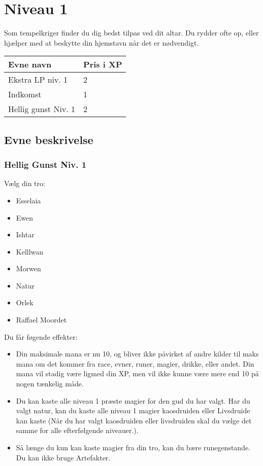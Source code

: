 \chapter{Niveau 1}
Som tempelkriger finder du dig bedst tilpas ved dit altar. Du rydder ofte op, eller hjælper med at beskytte din hjemstavn når det er nødvendigt.

\begin{table}[H]
    \centering
    \begin{tabular}{|p{}|p{}|}
    \rowcolor{cerulean!80}\hline
        Evne navn & Pris i XP \\\hline
        Ekstra LP niv. 1 &2\\\hline 
        Indkomst & 1\\\hline
        Hellig gunst Niv. 1 &2\\\hline
    \end{tabular}
\end{table}

\section{Evne beskrivelse}





\subsection{Hellig Gunst Niv. 1}
Vælg din tro: 
\begin{itemize}
    \item Esselaia
    \item Ewen
    \item Ishtar
    \item Kelllwan
    \item Morwen
    \item Natur
    \item Orlek
    \item Raffael Moordet
\end{itemize}

Du får føgende effekter:
\begin{itemize}
    \item Din maksimale mana er nu 10, og bliver ikke påvirket af andre kilder til maks mana om det kommer fra race, evner, runer, magier, drikke, eller andet. Din mana vil stadig være ligmed din XP, men vil ikke kunne være mere end 10 på nogen tænkelig måde. 
    \item Du kan kaste alle niveau 1 præste magier for den gud du har valgt. Har du valgt natur, kan du kaste alle niveau 1 magier kaosdruiden eller Livsdruide kan kaste (Når du har valgt kaosdruiden eller livsdruiden skal du vælge det samme for alle efterfølgende niveauer.).
    \item Så længe du kun kan kaste magier fra din tro, kan du bære runegenstande. Du kan ikke bruge Artefakter.
\end{itemize}